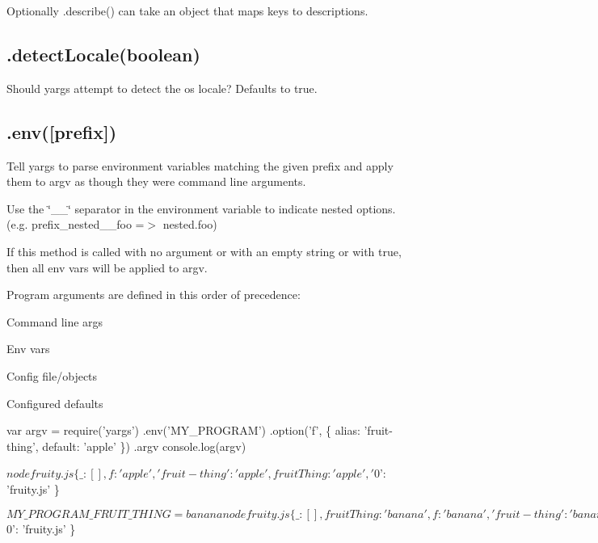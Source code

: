 Optionally {\ttfamily .describe()} can take an object that maps keys to descriptions.

\subsection*{.detect\+Locale(boolean) }

Should yargs attempt to detect the os\textquotesingle{} locale? Defaults to {\ttfamily true}.

\subsection*{.env(\mbox{[}prefix\mbox{]}) }

Tell yargs to parse environment variables matching the given prefix and apply them to argv as though they were command line arguments.

Use the \char`\"{}\+\_\+\+\_\+\char`\"{} separator in the environment variable to indicate nested options. (e.\+g. prefix\+\_\+nested\+\_\+\+\_\+foo =$>$ nested.\+foo)

If this method is called with no argument or with an empty string or with {\ttfamily true}, then all env vars will be applied to argv.

Program arguments are defined in this order of precedence\+:


\begin{DoxyEnumerate}
\item Command line args
\item Env vars
\item Config file/objects
\item Configured defaults
\end{DoxyEnumerate}


\begin{DoxyCode}
var argv = require('yargs')
  .env('MY\_PROGRAM')
  .option('f', \{
    alias: 'fruit-thing',
    default: 'apple'
  \})
  .argv
console.log(argv)
\end{DoxyCode}



\begin{DoxyCode}
$ node fruity.js
\{ \_: [],
  f: 'apple',
  'fruit-thing': 'apple',
  fruitThing: 'apple',
  '$0': 'fruity.js' \}
\end{DoxyCode}



\begin{DoxyCode}
$ MY\_PROGRAM\_FRUIT\_THING=banana node fruity.js
\{ \_: [],
  fruitThing: 'banana',
  f: 'banana',
  'fruit-thing': 'banana',
  '$0': 'fruity.js' \}
\end{DoxyCode}




